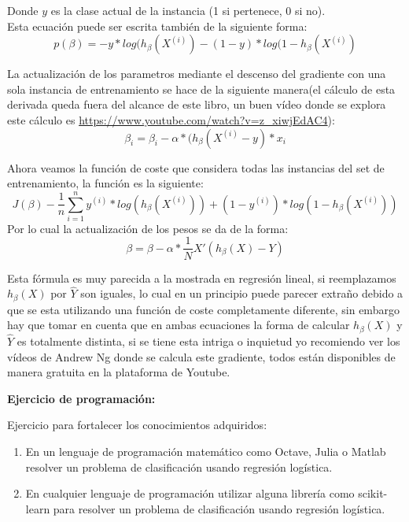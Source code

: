 \documentclass[11pt,fleqn]{book} %
\begin{document}
Donde $y$ es la clase actual de la instancia (1 si pertenece, 0 si no).\\
Esta ecuación puede ser escrita también de la siguiente forma:
\begin{equation}
    p( \beta ) = - y*log(h_\beta(X^{(i)}) - (1-y)*log(1-h_\beta(X^{(i)})
\label{eqn:costo_reg_logistica2} 
\end{equation}

La actualización de los parametros mediante el descenso del gradiente con una sola instancia de entrenamiento se hace de la siguiente manera(el cálculo de esta derivada queda fuera del alcance de este libro, un buen vídeo donde se explora este cálculo es \url{https://www.youtube.com/watch?v=z_xiwjEdAC4}):
\begin{equation}
\label{eqn:logistic_regression_gradient_descent}
\beta_i = \beta_i - \alpha * (h_\beta(X^{(i)}-y)*x_i
\end{equation}

Ahora veamos la función de coste que considera todas las instancias del set de entrenamiento, la función es la siguiente:
\begin{equation}
J(\beta) -\frac{1}{n} \sum_{i=1}^{n} y^{(i)}*log(h_\beta(X^{(i)}) ) + (1-y^{(i)})*log(1-h_\beta(X^{(i)}) )
\label{eqn:logistic_regression_fgradient_descent} 
\end{equation}
Por lo cual la actualización de los pesos se da de la forma:
\begin{equation}
\label{eqn:logistic_regression_gradient_descent2}
\beta = \beta - \alpha * \frac{1}{N} X' (h_\beta(X)-Y)
\end{equation}

Esta fórmula es muy parecida a la mostrada en regresión lineal, si reemplazamos $h_\beta(X)$ por $\hat{Y}$ son iguales, lo cual en un principio puede parecer extraño debido a que se esta utilizando una función de coste completamente diferente, sin embargo hay que tomar en cuenta que en ambas ecuaciones la forma de calcular $h_\beta(X)$ y $\hat{Y}$ es totalmente distinta, si se tiene esta intriga o inquietud yo recomiendo ver los vídeos de Andrew Ng donde se calcula este gradiente, todos están disponibles de manera gratuita en la plataforma de Youtube.

\clearpage

\textbf{Ejercicio de programación:}

Ejercicio para fortalecer los conocimientos adquiridos:

\begin{enumerate}
\item En un lenguaje de programación matemático como Octave, Julia o Matlab resolver un problema de clasificación usando regresión logística.
\item En cualquier lenguaje de programación utilizar alguna librería como scikit-learn para resolver un problema de clasificación usando regresión logística.
\end{enumerate}
\end{document}
